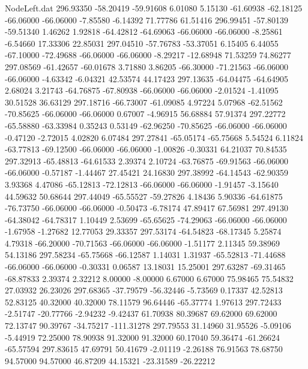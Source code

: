 \begin{filecontents}{NodeLeft.dat}
 296.93350  -58.20419  -59.91608     6.01080    5.15130  -61.60938  -62.18125  -66.06000  -66.06000   -7.85580   -6.14392   71.77786   61.51416
 296.99451  -57.80139  -59.51340     1.46262    1.92818  -64.42812  -64.69063  -66.06000  -66.06000   -8.25861   -6.54660   17.33306   22.85031
 297.04510  -57.76783  -53.37051     6.15405    6.44055  -67.10000  -72.49688  -66.06000  -66.06000   -8.29217  -12.68948   71.53259   74.86277
 297.08569  -61.42657  -60.01678     3.71880    3.86205  -66.30000  -71.21563  -66.06000  -66.06000   -4.63342   -6.04321   42.53574   44.17423
 297.13635  -64.04475  -64.64905     2.68024    3.21743  -64.76875  -67.80938  -66.06000  -66.06000   -2.01524   -1.41095   30.51528   36.63129
 297.18716  -66.73007  -61.09085     4.97224    5.07968  -62.51562  -70.85625  -66.06000  -66.06000    0.67007   -4.96915   56.68884   57.91374
 297.22772  -65.58880  -63.33984     0.35243    0.53149  -62.96250  -70.85625  -66.06000  -66.06000   -0.47120   -2.72015    4.02820    6.07484
 297.27841  -65.05174  -65.75668     5.54524    6.11824  -63.77813  -69.12500  -66.06000  -66.06000   -1.00826   -0.30331   64.21037   70.84535
 297.32913  -65.48813  -64.61533     2.39374    2.10724  -63.76875  -69.91563  -66.06000  -66.06000   -0.57187   -1.44467   27.45421   24.16830
 297.38992  -64.14543  -62.90359     3.93368    4.47086  -65.12813  -72.12813  -66.06000  -66.06000   -1.91457   -3.15640   44.59632   50.68644
 297.44049  -65.55527  -59.27826     4.18436    5.90336  -64.61875  -76.73750  -66.06000  -66.06000   -0.50473   -6.78174   47.89417   67.56981
 297.49130  -64.38042  -64.78317     1.10449    2.53699  -65.65625  -74.29063  -66.06000  -66.06000   -1.67958   -1.27682   12.77053   29.33357
 297.53174  -64.54823  -68.17345     5.25874    4.79318  -66.20000  -70.71563  -66.06000  -66.06000   -1.51177    2.11345   59.38969   54.13186
 297.58234  -65.75668  -66.12587     1.14031    1.31937  -65.52813  -71.44688  -66.06000  -66.06000   -0.30331    0.06587   13.18031   15.25001
 297.63287  -69.31465  -68.87833     2.39374    2.32212    8.00000   -8.00000    6.67000    6.67000   75.98465   75.54832   27.03932   26.23026
 297.68365  -37.79579  -56.32446    -5.73569    0.17337   42.52813   52.83125   40.32000   40.32000   78.11579   96.64446  -65.37774    1.97613
 297.72433   -2.51747  -20.77766    -2.94232   -9.42437   61.70938   80.39687   69.62000   69.62000   72.13747   90.39767  -34.75217 -111.31278
 297.79553   31.14960   31.95526    -5.09106   -5.44919   72.25000   78.90938   91.32000   91.32000   60.17040   59.36474  -61.26624  -65.57594
 297.83615   47.69791   50.41679    -2.01119   -2.26188   76.91563   78.68750   94.57000   94.57000   46.87209   44.15321  -23.31589  -26.22212

\end{filecontents}
